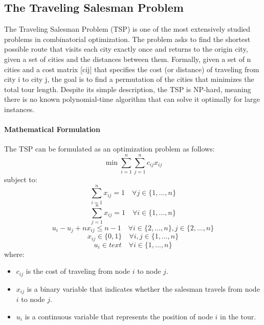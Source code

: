 \documentclass{article}
\begin{document}
\subsection{The Traveling Salesman Problem}
The Traveling Salesman Problem (TSP) is one of the most extensively studied problems in combinatorial optimization. The problem asks to find the shortest possible route that visits each city exactly once and returns to the origin city, 
given a set of cities and the distances between them.
Formally, given a set of n cities and a cost matrix [cij] that specifies the cost (or distance) of traveling from city i to city j, the goal is to find a permutation of the cities that minimizes the total tour length. 
Despite its simple description, the TSP is NP-hard, meaning there is no known polynomial-time algorithm that can solve it optimally for large instances.

\paragraph{Mathematical Formulation}
The TSP can be formulated as an optimization problem as follows:
\begin{equation}
	\min \sum_{i=1}^{n} \sum_{j=1}^{n} c_{ij} x_{ij}
\end{equation}
subject to:
\begin{equation}
	\sum_{i=1}^{n} x_{ij} = 1 \quad \forall j \in \{1, \ldots, n\}
\end{equation}
\begin{equation}
	\sum_{j=1}^{n} x_{ij} = 1 \quad \forall i \in \{1, \ldots, n\}
\end{equation}
\begin{equation}
	u_i - u_j + nx_{ij} \leq n-1 \quad \forall i \in \{2, \ldots, n\}, j \in \{2, \ldots, n\}
\end{equation}
\begin{equation}
	x_{ij} \in \{0, 1\} \quad \forall i, j \in \{1, \ldots, n\}
\end{equation}
\begin{equation}
	u_i \in \mathit{text} \quad \forall i \in \{1, \ldots, n\}
\end{equation}
where:
\begin{itemize}
	\item $c_{ij}$ is the cost of traveling from node $i$ to node $j$.
	\item $x_{ij}$ is a binary variable that indicates whether the salesman travels from node $i$ to node $j$.
	\item $u_i$ is a continuous variable that represents the position of node $i$ in the tour.
\end{itemize}
\end{document}

